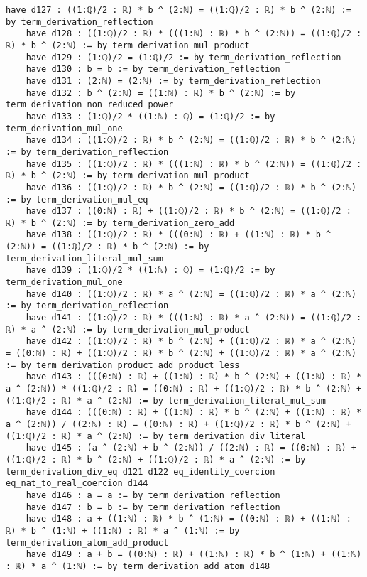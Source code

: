 \documentclass{article}
\begin{document}
\begin{tcolorbox}[colback=white!10, width=\linewidth]
\begin{lstlisting}[language=Lean4]
    have d127 : ((1:ℚ)/2 : ℝ) * b ^ (2:ℕ) = ((1:ℚ)/2 : ℝ) * b ^ (2:ℕ) := by term_derivation_reflection
    have d128 : ((1:ℚ)/2 : ℝ) * (((1:ℕ) : ℝ) * b ^ (2:ℕ)) = ((1:ℚ)/2 : ℝ) * b ^ (2:ℕ) := by term_derivation_mul_product
    have d129 : (1:ℚ)/2 = (1:ℚ)/2 := by term_derivation_reflection
    have d130 : b = b := by term_derivation_reflection
    have d131 : (2:ℕ) = (2:ℕ) := by term_derivation_reflection
    have d132 : b ^ (2:ℕ) = ((1:ℕ) : ℝ) * b ^ (2:ℕ) := by term_derivation_non_reduced_power
    have d133 : (1:ℚ)/2 * ((1:ℕ) : ℚ) = (1:ℚ)/2 := by term_derivation_mul_one
    have d134 : ((1:ℚ)/2 : ℝ) * b ^ (2:ℕ) = ((1:ℚ)/2 : ℝ) * b ^ (2:ℕ) := by term_derivation_reflection
    have d135 : ((1:ℚ)/2 : ℝ) * (((1:ℕ) : ℝ) * b ^ (2:ℕ)) = ((1:ℚ)/2 : ℝ) * b ^ (2:ℕ) := by term_derivation_mul_product
    have d136 : ((1:ℚ)/2 : ℝ) * b ^ (2:ℕ) = ((1:ℚ)/2 : ℝ) * b ^ (2:ℕ) := by term_derivation_mul_eq
    have d137 : ((0:ℕ) : ℝ) + ((1:ℚ)/2 : ℝ) * b ^ (2:ℕ) = ((1:ℚ)/2 : ℝ) * b ^ (2:ℕ) := by term_derivation_zero_add
    have d138 : ((1:ℚ)/2 : ℝ) * (((0:ℕ) : ℝ) + ((1:ℕ) : ℝ) * b ^ (2:ℕ)) = ((1:ℚ)/2 : ℝ) * b ^ (2:ℕ) := by term_derivation_literal_mul_sum
    have d139 : (1:ℚ)/2 * ((1:ℕ) : ℚ) = (1:ℚ)/2 := by term_derivation_mul_one
    have d140 : ((1:ℚ)/2 : ℝ) * a ^ (2:ℕ) = ((1:ℚ)/2 : ℝ) * a ^ (2:ℕ) := by term_derivation_reflection
    have d141 : ((1:ℚ)/2 : ℝ) * (((1:ℕ) : ℝ) * a ^ (2:ℕ)) = ((1:ℚ)/2 : ℝ) * a ^ (2:ℕ) := by term_derivation_mul_product
    have d142 : ((1:ℚ)/2 : ℝ) * b ^ (2:ℕ) + ((1:ℚ)/2 : ℝ) * a ^ (2:ℕ) = ((0:ℕ) : ℝ) + ((1:ℚ)/2 : ℝ) * b ^ (2:ℕ) + ((1:ℚ)/2 : ℝ) * a ^ (2:ℕ) := by term_derivation_product_add_product_less
    have d143 : (((0:ℕ) : ℝ) + ((1:ℕ) : ℝ) * b ^ (2:ℕ) + ((1:ℕ) : ℝ) * a ^ (2:ℕ)) * ((1:ℚ)/2 : ℝ) = ((0:ℕ) : ℝ) + ((1:ℚ)/2 : ℝ) * b ^ (2:ℕ) + ((1:ℚ)/2 : ℝ) * a ^ (2:ℕ) := by term_derivation_literal_mul_sum
    have d144 : (((0:ℕ) : ℝ) + ((1:ℕ) : ℝ) * b ^ (2:ℕ) + ((1:ℕ) : ℝ) * a ^ (2:ℕ)) / ((2:ℕ) : ℝ) = ((0:ℕ) : ℝ) + ((1:ℚ)/2 : ℝ) * b ^ (2:ℕ) + ((1:ℚ)/2 : ℝ) * a ^ (2:ℕ) := by term_derivation_div_literal
    have d145 : (a ^ (2:ℕ) + b ^ (2:ℕ)) / ((2:ℕ) : ℝ) = ((0:ℕ) : ℝ) + ((1:ℚ)/2 : ℝ) * b ^ (2:ℕ) + ((1:ℚ)/2 : ℝ) * a ^ (2:ℕ) := by term_derivation_div_eq d121 d122 eq_identity_coercion eq_nat_to_real_coercion d144
    have d146 : a = a := by term_derivation_reflection
    have d147 : b = b := by term_derivation_reflection
    have d148 : a + ((1:ℕ) : ℝ) * b ^ (1:ℕ) = ((0:ℕ) : ℝ) + ((1:ℕ) : ℝ) * b ^ (1:ℕ) + ((1:ℕ) : ℝ) * a ^ (1:ℕ) := by term_derivation_atom_add_product
    have d149 : a + b = ((0:ℕ) : ℝ) + ((1:ℕ) : ℝ) * b ^ (1:ℕ) + ((1:ℕ) : ℝ) * a ^ (1:ℕ) := by term_derivation_add_atom d148

\end{lstlisting}
\end{tcolorbox}
\end{document}
